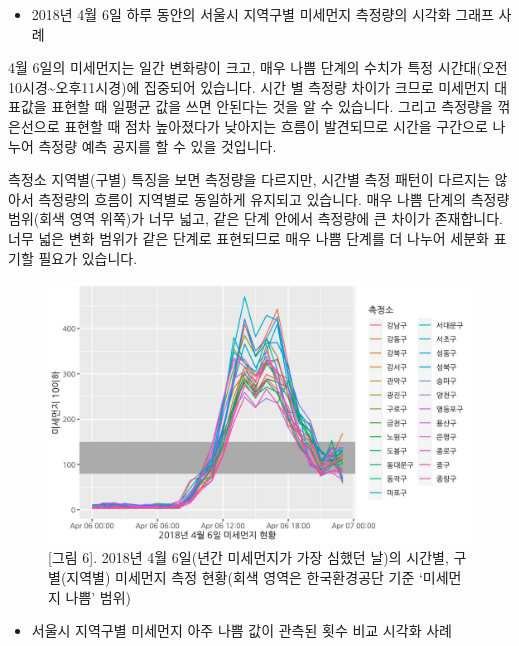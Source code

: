 \documentclass[
  letterpaper,
]{book}
\providecommand{\tightlist}{%
  \setlength{\itemsep}{0pt}\setlength{\parskip}{0pt}}\usepackage{longtable,booktabs,array}
\begin{document}
\begin{itemize}
\tightlist
\item
  2018년 4월 6일 하루 동안의 서울시 지역구별 미세먼지 측정량의 시각화
  그래프 사례
\end{itemize}

4월 6일의 미세먼지는 일간 변화량이 크고, 매우 나쁨 단계의 수치가 특정
시간대(오전 10시경\textasciitilde 오후11시경)에 집중되어 있습니다. 시간
별 측정량 차이가 크므로 미세먼지 대표값을 표현할 때 일평균 값을 쓰면
안된다는 것을 알 수 있습니다. 그리고 측정량을 꺾은선으로 표현할 때 점차
높아졌다가 낮아지는 흐름이 발견되므로 시간을 구간으로 나누어 측정량 예측
공지를 할 수 있을 것입니다.

측정소 지역별(구별) 특징을 보면 측정량을 다르지만, 시간별 측정 패턴이
다르지는 않아서 측정량의 흐름이 지역별로 동일하게 유지되고 있습니다.
매우 나쁨 단계의 측정량 범위(회색 영역 위쪽)가 너무 넓고, 같은 단계
안에서 측정량에 큰 차이가 존재합니다. 너무 넓은 변화 범위가 같은 단계로
표현되므로 매우 나쁨 단계를 더 나누어 세분화 표기할 필요가 있습니다.

\begin{figure}[H]

{\centering \includegraphics{img/fig6.png}

}

\caption{{[}그림 6{]}. 2018년 4월 6일(년간 미세먼지가 가장 심했던 날)의
시간별, 구별(지역별) 미세먼지 측정 현황(회색 영역은 한국환경공단 기준
`미세먼지 나쁨' 범위)}

\end{figure}%

\begin{itemize}
\tightlist
\item
  서울시 지역구별 미세먼지 아주 나쁨 값이 관측된 횟수 비교 시각화 사례
\end{itemize}
\end{document}
